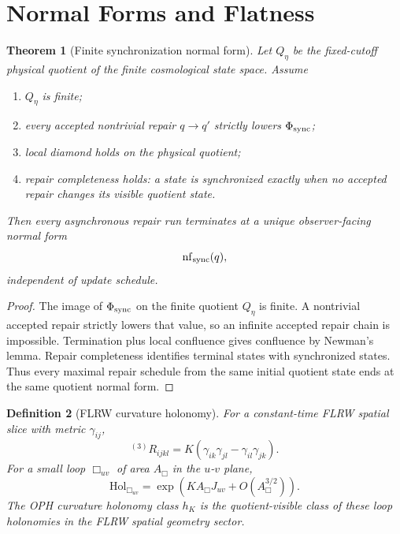 \documentclass[11pt]{article}
\newtheorem{theorem}{Theorem}[section]
\newtheorem{definition}[theorem]{Definition}
\newcommand{\Hol}{\mathrm{Hol}}
\newcommand{\nf}{\operatorname{nf}}
\begin{document}
\section{Normal Forms and Flatness}

\begin{theorem}[Finite synchronization normal form]\label{thm:normalform}
Let \(Q_\eta\) be the fixed-cutoff physical quotient of the finite cosmological state space. Assume
\begin{enumerate}[leftmargin=2em]
\item \(Q_\eta\) is finite;
\item every accepted nontrivial repair \(q\to q'\) strictly lowers \(\Phi_{\rm sync}\);
\item local diamond holds on the physical quotient;
\item repair completeness holds: a state is synchronized exactly when no accepted repair changes
its visible quotient state.
\end{enumerate}
Then every asynchronous repair run terminates at a unique observer-facing normal form
\[
\nf_{\rm sync}(q),
\]
independent of update schedule.
\end{theorem}

\begin{proof}
The image of \(\Phi_{\rm sync}\) on the finite quotient \(Q_\eta\) is finite. A nontrivial accepted
repair strictly lowers that value, so an infinite accepted repair chain is impossible. Termination
plus local confluence gives confluence by Newman's lemma. Repair completeness identifies terminal
states with synchronized states. Thus every maximal repair schedule from the same initial quotient
state ends at the same quotient normal form.
\end{proof}

\begin{definition}[FLRW curvature holonomy]
For a constant-time FLRW spatial slice with metric \(\gamma_{ij}\),
\[
{}^{(3)}R_{ijkl}
=
K(\gamma_{ik}\gamma_{jl}-\gamma_{il}\gamma_{jk}).
\]
For a small loop \(\Box_{uv}\) of area \(A_\Box\) in the \(u\)-\(v\) plane,
\[
\Hol_{\Box_{uv}}
=
\exp\!\left(KA_\Box J_{uv}+O(A_\Box^{3/2})\right).
\]
The OPH curvature holonomy class \(h_K\) is the quotient-visible class of these loop holonomies in
the FLRW spatial geometry sector.
\end{definition}
\end{document}
